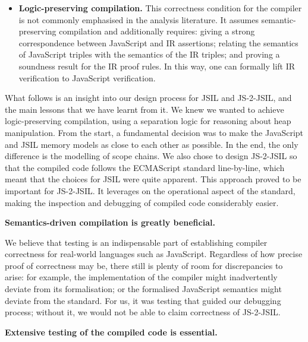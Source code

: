 \documentclass{llncs}
\newcounter{main}
\newcommand{\JSComp}{JS-2-JSIL\xspace}
\begin{document}
\begin{itemize}
\item {\bfseries Logic-preserving compilation.} This correctness
  condition for the compiler is not commonly emphasised  in the analysis literature. 
It assumes semantic-preserving compilation and additionally 
requires: giving a strong correspondence
  between JavaScript and IR assertions; 
  relating the semantics of JavaScript triples 
  with the semantics of the IR triples; and 
  proving a soundness result for the IR proof rules.
In this way, one can formally lift IR
verification to JavaScript verification. 



\end{itemize}


What follows is an insight into
our design process for JSIL and JS-2-JSIL, and the main lessons that
we have learnt from it. We knew we wanted to achieve logic-preserving compilation, using a
separation logic for reasoning about heap manipulation.
From the start, a fundamental decision was to make the JavaScript
and JSIL memory models as close to each other as
possible. In the end, the only difference is the modelling of scope chains.
We also chose to design \JSComp so that the compiled
code follows the ECMAScript standard line-by-line, which meant that
the choices for JSIL were quite apparent.
This approach proved  to be important for \JSComp. It leverages on the operational aspect of the standard, making the inspection and debugging of compiled code considerably easier. 
\begin{center}
{\bfseries \small
Semantics-driven compilation is greatly  beneficial.
} \end{center}

We believe that testing is an indispensable part of establishing compiler correctness for real-world languages such as JavaScript. 
Regardless of how precise proof of correctness may be, there still is plenty of room for discrepancies to arise:
for example, the implementation of the compiler might inadvertently deviate from its formalisation; or the formalised JavaScript semantics might deviate from the standard. 
For us, it was testing that guided our debugging process; without it, we would not be able to claim correctness of \JSComp. 
\begin{center}
{\bfseries \small
Extensive testing of the compiled code is essential.}
\end{center}
\end{document}
